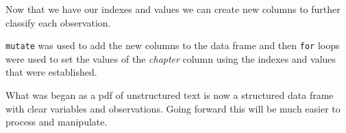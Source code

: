 \documentclass[]{article}
\newenvironment{Shaded}{\begin{snugshade}}{\end{snugshade}}
\newcommand{\ControlFlowTok}[1]{\textcolor[rgb]{0.13,0.29,0.53}{\textbf{#1}}}
\newcommand{\DataTypeTok}[1]{\textcolor[rgb]{0.13,0.29,0.53}{#1}}
\newcommand{\DecValTok}[1]{\textcolor[rgb]{0.00,0.00,0.81}{#1}}
\newcommand{\KeywordTok}[1]{\textcolor[rgb]{0.13,0.29,0.53}{\textbf{#1}}}
\newcommand{\NormalTok}[1]{#1}
\newcommand{\OperatorTok}[1]{\textcolor[rgb]{0.81,0.36,0.00}{\textbf{#1}}}
\newcommand{\StringTok}[1]{\textcolor[rgb]{0.31,0.60,0.02}{#1}}
\begin{document}
Now that we have our indexes and values we can create new columns to
further classify each observation.

\begin{Shaded}
\end{Shaded}

\texttt{mutate} was used to add the new columns to the data frame and
then \texttt{for} loops were used to set the values of the
\emph{chapter} column using the indexes and values that were
established.

What was began as a pdf of unstructured text is now a structured data
frame with clear variables and observations. Going forward this will be
much easier to process and manipulate.
\end{document}
